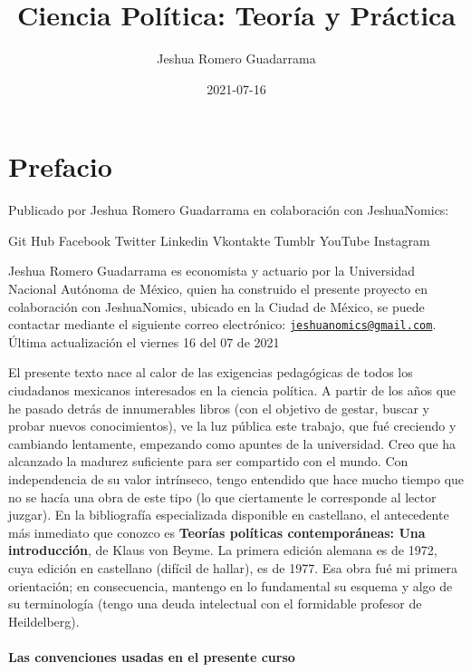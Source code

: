 \documentclass[
]{book}
\title{Ciencia Política: Teoría y Práctica}
\author{Jeshua Romero Guadarrama}
\date{2021-07-16}
\begin{document}
\maketitle

{
\setcounter{tocdepth}{1}
\tableofcontents
}
\hypertarget{prefacio}{%
\chapter*{Prefacio}\label{prefacio}}

Publicado por Jeshua Romero Guadarrama en colaboración con JeshuaNomics:

{ Git Hub}
{ Facebook}
{ Twitter}
{ Linkedin}
{ Vkontakte}
{ Tumblr}
{ YouTube}
{ Instagram}

Jeshua Romero Guadarrama es economista y actuario por la Universidad Nacional Autónoma de México, quien ha construido el presente proyecto en colaboración con JeshuaNomics, ubicado en la Ciudad de México, se puede contactar mediante el siguiente correo electrónico: \href{mailto:jeshuanomics@gmail.com}{\nolinkurl{jeshuanomics@gmail.com}}.
Última actualización el viernes 16 del 07 de 2021

El presente texto nace al calor de las exigencias pedagógicas de todos los ciudadanos mexicanos interesados en la ciencia política. A partir de los años que he pasado detrás de innumerables libros (con el objetivo de gestar, buscar y probar nuevos conocimientos), ve la luz pública este trabajo, que fué creciendo y cambiando lentamente, empezando como apuntes de la universidad. Creo que ha alcanzado la madurez suficiente para ser compartido con el mundo. Con independencia de su valor intrínseco, tengo entendido que hace mucho tiempo que no se hacía una obra de este tipo (lo que ciertamente le corresponde al lector juzgar). En la bibliografía especializada disponible en castellano, el antecedente más inmediato que conozco es \textbf{Teorías políticas contemporáneas: Una introducción}, de Klaus von Beyme. La primera edición alemana es de 1972, cuya edición en castellano (difícil de hallar), es de 1977. Esa obra fué mi primera orientación; en consecuencia, mantengo en lo fundamental su esquema y algo de su terminología (tengo una deuda intelectual con el formidable profesor de Heildelberg).

\hypertarget{las-convenciones-usadas-en-el-presente-curso}{%
\subsubsection*{Las convenciones usadas en el presente curso}\label{las-convenciones-usadas-en-el-presente-curso}}
\end{document}

